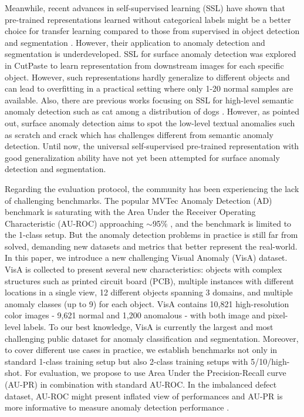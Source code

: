 \documentclass[runningheads]{llncs}
\begin{document}
Meanwhile, recent advances in self-supervised learning (SSL) have shown that pre-trained representations learned without categorical labels might be a better choice for transfer learning compared to those from supervised in object detection and segmentation \cite{chen2020simple,chen2021exploring,he2020momentum}. However, their application to anomaly detection and segmentation is underdeveloped. SSL for surface anomaly detection was explored in CutPaste \cite{li2021cutpaste} to learn representation from downstream images for each specific object. However, such representations hardly generalize to different objects and can lead to overfitting in a practical setting where only 1-20 normal samples are available. Also, there are previous works focusing on SSL for high-level semantic anomaly detection such as cat among a distribution of dogs \cite{cook2020consult,davis2006relationship,saito2015precision}. However, as \cite{ruff2021unifying} pointed out, surface anomaly detection aims to spot the low-level textual anomalies such as scratch and crack which has challenges different from semantic anomaly detection. Until now, the universal self-supervised pre-trained representation with good generalization ability have not yet been attempted for surface anomaly detection and segmentation.

Regarding the evaluation protocol, the community has been experiencing the lack of challenging benchmarks. The popular MVTec Anomaly Detection (AD) benchmark \cite{bergmann2021mvtec} is  saturating with the Area Under the Receiver Operating Characteristic (AU-ROC) approaching $\sim$95\% \cite{defard2021padim,li2021cutpaste}, and the benchmark is limited to the 1-class setup. But the anomaly detection problems in practice is still far from solved, demanding new datasets and metrics that better represent the real-world. In this paper, we introduce a new challenging Visual Anomaly (VisA) dataset. VisA is collected to present several new characteristics: objects with complex structures such as printed circuit board (PCB), multiple instances with different locations in a single view, 12 different objects spanning 3 domains, and multiple anomaly classes (up to 9) for each object. VisA contains 10,821 high-resolution color images - 9,621 normal and 1,200 anomalous - with both image and pixel-level labels. To our best knowledge, VisA is currently the largest and most challenging public dataset for anomaly classification and segmentation. Moreover, to cover different use cases in practice, we establish benchmarks not only in standard 1-class training setup but also 2-class training setups with 5/10/high-shot. For evaluation, we propose to use Area Under the Precision-Recall curve (AU-PR) in combination with standard AU-ROC. In the imbalanced defect dataset, AU-ROC might present inflated view of performances and AU-PR is more informative to measure anomaly detection performance \cite{cook2020consult,davis2006relationship,saito2015precision}.
\end{document}
